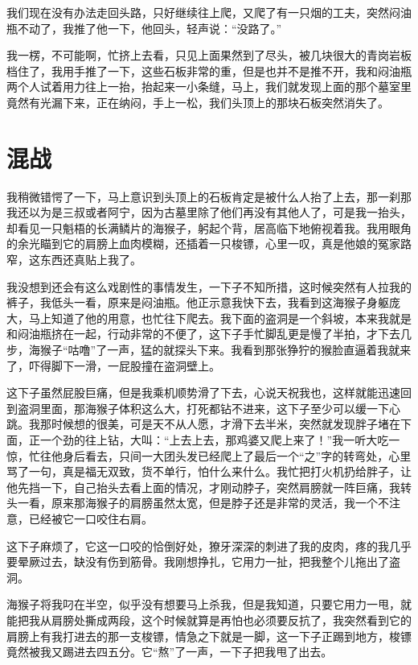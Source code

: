 我们现在没有办法走回头路，只好继续往上爬，又爬了有一只烟的工夫，突然闷油瓶不动了，我推了他一下，他回头，轻声说：“没路了。”

我一楞，不可能啊，忙挤上去看，只见上面果然到了尽头，被几块很大的青岗岩板档住了，我用手推了一下，这些石板非常的重，但是也并不是推不开，我和闷油瓶两个人试着用力往上一抬，抬起来一小条缝，马上，我们就发现上面的那个墓室里竟然有光漏下来，正在纳闷，手上一松，我们头顶上的那块石板突然消失了。

\chapter{混战}

我稍微错愕了一下，马上意识到头顶上的石板肯定是被什么人抬了上去，那一刹那我还以为是三叔或者阿宁，因为古墓里除了他们再没有其他人了，可是我一抬头，却看见一只魁梧的长满鳞片的海猴子，躬起个背，居高临下地俯视着我。我用眼角的余光瞄到它的肩膀上血肉模糊，还插着一只梭镖，心里一叹，真是他娘的冤家路窄，这东西还真贴上我了。

我没想到还会有这么戏剧性的事情发生，一下子不知所措，这时候突然有人拉我的裤子，我低头一看，原来是闷油瓶。他正示意我快下去，我看到这海猴子身躯庞大，马上知道了他的用意，也忙往下爬去。我下面的盗洞是一个斜坡，本来我就是和闷油瓶挤在一起，行动非常的不便了，这下子手忙脚乱更是慢了半拍，才下去几步，海猴子“咕噜”了一声，猛的就探头下来。我看到那张狰狞的猴脸直逼着我就来了，吓得脚下一滑，一屁股撞在盗洞壁上。

这下子虽然屁股巨痛，但是我乘机顺势滑了下去，心说天祝我也，这样就能迅速回到盗洞里面，那海猴子体积这么大，打死都钻不进来，这下子至少可以缓一下心跳。我那时候想的很美，可是天不从人愿，才滑下去半米，突然就发现胖子堵在下面，正一个劲的往上钻，大叫：“上去上去，那鸡婆又爬上来了！”我一听大吃一惊，忙往他身后看去，只间一大团头发已经爬上了最后一个“之”字的转弯处，心里骂了一句，真是福无双致，货不单行，怕什么来什么。我忙把打火机扔给胖子，让他先挡一下，自己抬头去看上面的情况，才刚动脖子，突然肩膀就一阵巨痛，我转头一看，原来那海猴子的肩膀虽然太宽，但是脖子还是非常的灵活，我一个不注意，已经被它一口咬住右肩。

这下子麻烦了，它这一口咬的恰倒好处，獠牙深深的刺进了我的皮肉，疼的我几乎要晕厥过去，缺没有伤到筋骨。我刚想挣扎，它用力一扯，把我整个儿拖出了盗洞。

海猴子将我叼在半空，似乎没有想要马上杀我，但是我知道，只要它用力一甩，就能把我从肩膀处撕成两段，这个时候就算是再怕也必须要反抗了，我突然看到它的肩膀上有我打进去的那一支梭镖，情急之下就是一脚，这一下子正踢到地方，梭镖竟然被我又踢进去四五分。它“熬”了一声，一下子把我甩了出去。

